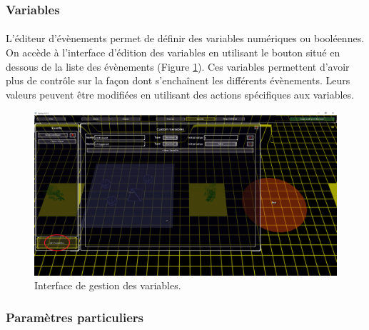 \documentclass[a4paper]{article}
\begin{document}
\subsubsection{Variables}
\paragraph{ }
L'éditeur d'évènements permet de définir des variables numériques ou booléennes. On accède à l'interface d'édition des variables en utilisant le bouton situé en dessous de la liste des évènements (Figure \ref{fig:editor-variables}). Ces variables permettent d'avoir plus de contrôle sur la façon dont s'enchaînent les différents évènements. Leurs valeurs peuvent être modifiées en utilisant des actions spécifiques aux variables.
\begin{figure}[H]
\centering
\includegraphics[width=\linewidth]{editor-variables.png}
\caption{Interface de gestion des variables.}
\label{fig:editor-variables}
\end{figure}
\subsubsection{Paramètres particuliers}
\end{document}
